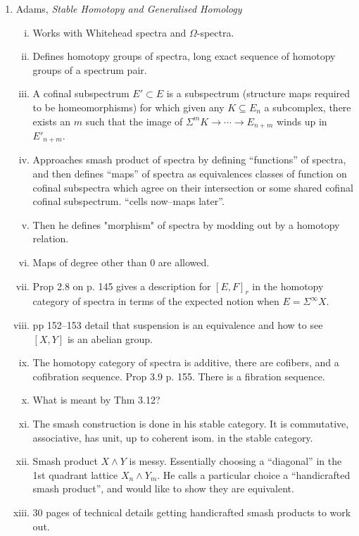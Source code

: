 \documentclass{article}%
\begin{document}
\begin{enumerate}
\item Adams, {\it Stable Homotopy and Generalised Homology}
\begin{enumerate}[i. ]
\item Works with Whitehead spectra and $\Omega$-spectra.
\item Defines homotopy groups of spectra, long exact sequence of
  homotopy groups of a spectrum pair.
\item A cofinal subspectrum $E' \subset E$ is a subspectrum
  (structure maps required to be homeomorphisms) for which given any
  $K\subseteq E_n$ a subcomplex, there exists an $m$ such that the
  image of $\Sigma^m K \rightarrow \cdots \rightarrow E_{n+m}$ winds
  up in $E'_{n+m}$.
\item Approaches smash product of spectra by defining ``functions'' of
  spectra, and then defines ``maps'' of spectra as equivalences classes
  of function on cofinal subspectra which agree on their intersection
  or some shared cofinal cofinal subspectrum. ``cells now--maps
  later''. 
\item Then he defines "morphism" of spectra by modding out by a
  homotopy relation.
\item Maps of degree other than 0 are allowed.
\item Prop 2.8 on p. 145 gives a description for $[E,F]_r$ in the
  homotopy category of spectra in terms of the expected notion when
  $E=\Sigma^{\infty}X$.
\item pp 152--153 detail that suspension is an equivalence and how to
  see $[X,Y]$ is an abelian group.
\item The homotopy category of spectra is additive, there are
  cofibers, and a cofibration sequence. Prop 3.9 p. 155. There is a
  fibration sequence.
\item What is meant by Thm 3.12? 
\item The smash construction is done in his stable category. It is
  commutative, associative, has unit, up to coherent isom. in the
  stable category.
\item Smash product $X\wedge Y$ is messy. Essentially choosing a
  ``diagonal'' in the 1st quadrant lattice $X_n \wedge Y_m$. He calls a
  particular choice a ``handicrafted smash product'', and would like to
  show they are equivalent.
\item 30 pages of technical details getting handicrafted smash
  products to work out.
\end{enumerate}


\end{enumerate}
\end{document}
